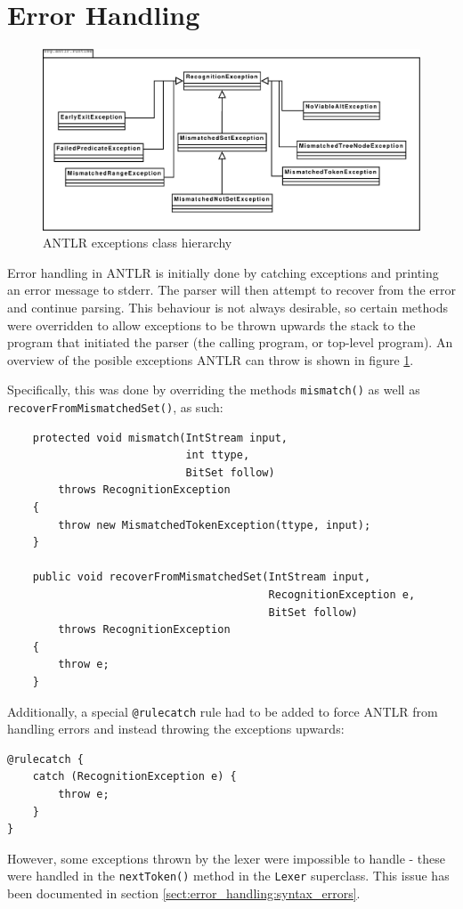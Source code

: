 \section{Error Handling}
\label{sec:impl:errorhandling}
\begin{figure}[!h]
  \centering
    \includegraphics[width=1\textwidth]{diagrams/exception_uml}
  \caption{ANTLR exceptions class hierarchy}
\label{fig:antlrException}
\end{figure}
Error handling in ANTLR is initially done by catching exceptions and printing
an error message to stderr. The parser will then attempt to recover from the
error and continue parsing. This behaviour is not always desirable, so certain
methods were overridden to allow exceptions to be thrown upwards the stack to
the program that initiated the parser (the calling program, or top-level
program). An overview of the posible exceptions ANTLR can throw is shown in figure \ref{fig:antlrException}.

Specifically, this was done by overriding the methods \verb!mismatch()! as well as
\verb!recoverFromMismatchedSet()!, as such:

\begin{Verbatim}
    protected void mismatch(IntStream input, 
                            int ttype, 
                            BitSet follow)
        throws RecognitionException
    {
        throw new MismatchedTokenException(ttype, input);
    }

    public void recoverFromMismatchedSet(IntStream input, 
                                         RecognitionException e, 
                                         BitSet follow)
        throws RecognitionException
    {
        throw e;
    }
\end{Verbatim}

Additionally, a special \verb!@rulecatch! rule had to be added to force ANTLR from
handling errors and instead throwing the exceptions upwards:

\begin{Verbatim}
@rulecatch {
    catch (RecognitionException e) {
        throw e;
    }
}
\end{Verbatim}

However, some exceptions thrown by the lexer were impossible to handle - these
were handled in the \verb!nextToken()! method in the \verb!Lexer! superclass.
This issue has been documented in section 
\ref{sect:error_handling:syntax_errors}.
